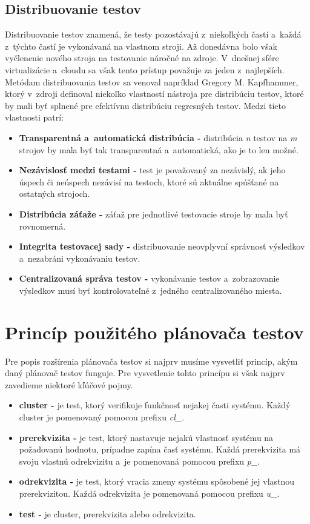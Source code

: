 \subsection*{Distribuovanie testov}
Distribuovanie testov znamená, že testy pozostávajú z~niekoľkých častí a~každá z~týchto častí je vykonávaná na vlastnom stroji.
Až donedávna bolo však vyčlenenie nového stroja na testovanie náročné na zdroje.
V~dnešnej sfére virtualizácie a~cloudu sa však tento prístup považuje za jeden z~najlepších.
Metódam distribuovania testov sa venoval napríklad Gregory M. Kapfhammer, ktorý v~zdroji \cite{Kapfhammer} definoval niekoľko
vlastností nástroja pre distribúciu testov, ktoré by mali byť splnené pre efektívnu distribúciu regresných testov.
Medzi tieto vlastnosti patrí:
\begin{itemize}
\item \textbf{Transparentná a~automatická distribúcia -} distribúcia \emph{n} testov na \emph{m} strojov by mala byť tak transparentná a~automatická,
ako je to len možné.
\item \textbf{Nezávislosť medzi testami -} test je považovaný za nezávislý, ak jeho úspech či neúspech nezávisí na testoch, ktoré
sú aktuálne spúšťané na ostatných strojoch. 
\item \textbf{Distribúcia záťaže -} záťaž pre jednotlivé testovacie stroje by mala byť rovnomerná.
\item \textbf{Integrita testovacej sady -} distribuovanie neovplyvní správnosť výsledkov a~nezabráni vykonávaniu testov.
\item \textbf{Centralizovaná správa testov -} vykonávanie testov a~zobrazovanie výsledkov musí byť kontrolovateľné z~jedného centralizovaného miesta.
\end{itemize}




\section{Princíp použitého plánovača testov} \label{sekcia:planovac}
Pre popis rozšírenia plánovača testov si najprv musíme vysvetliť princíp, akým daný plánovač testov funguje.
Pre vysvetlenie tohto princípu si však najprv zavedieme niektoré kľúčové pojmy.
\begin{itemize}
\item \textbf{cluster -} je test, ktorý verifikuje funkčnosť nejakej časti systému. Každý cluster je pomenovaný pomocou prefixu {\it cl\_}. 
\item \textbf{prerekvizita -} je test, ktorý nastavuje nejakú vlastnosť systému na požadovanú hodnotu, prípadne zapína časť systému. 
Každá prerekvizita má svoju vlastnú odrekvizitu a~je pomenovaná pomocou prefixu {\it p\_}.
\item \textbf{odrekvizita -} je test, ktorý vracia zmeny systému spôsobené jej vlastnou prerekvizitou. Každá odrekvizita je pomenovaná
pomocou prefixu {\it u\_}. 
\item \textbf{test -} je cluster, prerekvizita alebo odrekvizita.
\end{itemize}

